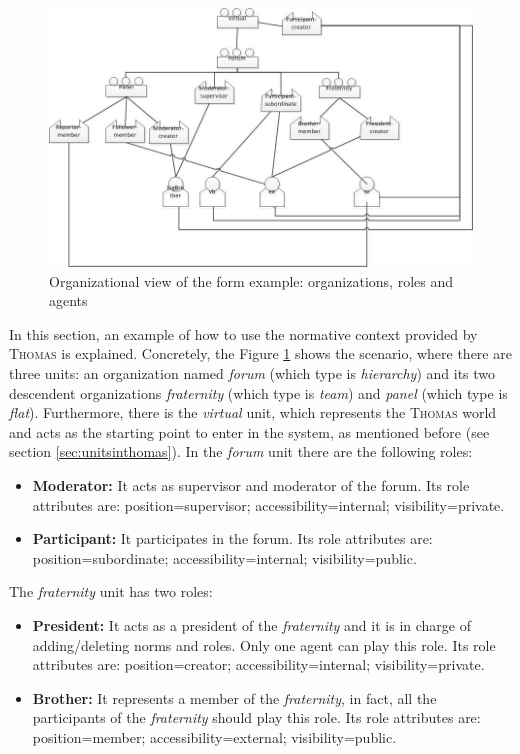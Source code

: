 \begin{figure}[hbtp]
\includegraphics[width=1\textwidth]{Thomas/images/ejemploNormas.jpg}
\caption{Organizational view of the form example: organizations, roles and agents}
\label{fig:normExample}
\end{figure}

In this section,  an example of how to use the normative context provided by \textsc{Thomas} is explained. Concretely,  the Figure \ref{fig:normExample} shows the scenario, where there are three units:  an organization named \textit{forum} (which type is \textit{hierarchy}) and its two descendent organizations \textit{fraternity} (which type is \textit{team}) and \textit{panel} (which type is \textit{flat}). Furthermore, there is the \textit{virtual} unit, which represents the \textsc{Thomas} world  and acts as the starting point to enter in the system, as mentioned before (see section \ref{sec:unitsinthomas}). In the \textit{forum} unit there are the following roles:

\begin{itemize}
\item \textbf{Moderator:} It acts as supervisor and moderator of the forum. Its role attributes are: position=supervisor; accessibility=internal; visibility=private.
\item \textbf{Participant:} It participates in the forum.  Its role attributes are: position=subordinate; accessibility=internal; visibility=public.
\end{itemize}

The \textit{fraternity} unit has two roles:

\begin{itemize}
\item \textbf{President:} It acts as a president of the \textit{fraternity} and it is in  charge of adding/deleting norms and roles.  Only one agent can play this role. Its role attributes are: position=creator; accessibility=internal; visibility=private.
\item \textbf{Brother:} It represents a member of the \textit{fraternity}, in fact, all the participants of the \textit{fraternity} should play this role.  Its role attributes are: position=member; accessibility=external; visibility=public.
\end{itemize}

